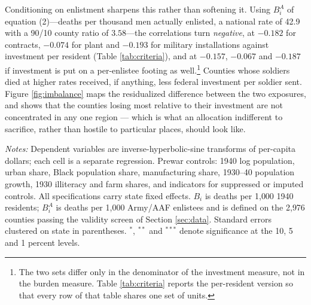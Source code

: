 \documentclass[12pt]{article}
\newcommand{\fittab}[1]{%
  \sbox{\tabbox}{#1}%
  \ifdim\wd\tabbox>\textwidth
    \resizebox{\textwidth}{!}{\usebox{\tabbox}}%
  \else\usebox{\tabbox}\fi}
\begin{document}
Conditioning on enlistment sharpens this rather than softening it. Using $B_i^{A}$
of equation (2)---deaths per thousand men actually enlisted, a national rate of
42.9 with a 90/10 county ratio of $3.58$---the correlations turn
\emph{negative}, at $-0.182$ for contracts, $-0.074$ for plant and $-0.193$ for
military installations against investment per resident (Table
\ref{tab:criteria}), and at $-0.157$, $-0.067$ and $-0.187$ if investment is put
on a per-enlistee footing as well.\footnote{The two sets differ only in the
denominator of the investment measure, not in the burden measure. Table
\ref{tab:criteria} reports the per-resident version so that every row of that
table shares one set of units.} Counties whose soldiers died at higher rates
received, if anything, less federal investment per soldier sent. Figure \ref{fig:imbalance} maps the
residualized difference between the two exposures, and shows that the counties
losing most relative to their investment are not concentrated in any one region
--- which is what an allocation indifferent to sacrifice, rather than hostile to
particular places, should look like.

\begin{table}[!htbp]
\centering
\caption{Did fatal burden predict federal war investment?}
\label{tab:allocation}
\fittab{}
\vspace{2pt}
\begin{minipage}{\textwidth}\footnotesize \textit{Notes:} Dependent variables are inverse-hyperbolic-sine transforms of per-capita dollars; each cell is a separate regression. Prewar controls: 1940 log population, urban share, Black population share, manufacturing share, 1930--40 population growth, 1930 illiteracy and farm shares, and indicators for suppressed or imputed controls. All specifications carry state fixed effects. $B_i$ is deaths per 1{,}000 1940 residents; $B_i^{A}$ is deaths per 1{,}000 Army/AAF enlistees and is defined on the 2{,}976 counties passing the validity screen of Section \ref{sec:data}. Standard errors clustered on state in parentheses. $^{*}$, $^{**}$ and $^{***}$ denote significance at the 10, 5 and 1 percent levels.\end{minipage}
\end{table}
\end{document}
